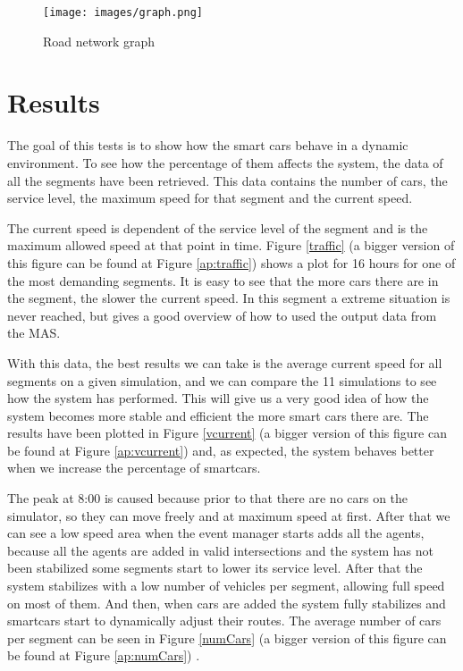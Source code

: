 \begin{figure}[!ht]
  \centering
  \texttt{[image: images/graph.png]} 
  \caption{Road network graph}
  \label{graph}
\end{figure}

\section{Results}

The goal of this tests is to show how the smart cars behave in a dynamic environment. To see how the percentage of them affects the system, the data of all the segments have been retrieved. This data contains the number of cars, the service level, the maximum speed for that segment and the current speed.

The current speed is dependent of the service level of the segment and is the maximum allowed speed at that point in time. Figure \ref{traffic} (a bigger version of this figure can be found at Figure \ref{ap:traffic}) shows a plot for 16 hours for one of the most demanding segments. It is easy to see that the more cars there are in the segment, the slower the current speed. In this segment a extreme situation is never reached, but gives a good overview of how to used the output data from the MAS.

With this data, the best results we can take is the average current speed for all segments on a given simulation, and we can compare the 11 simulations to see how the system has performed. This will give us a very good idea of how the system becomes more stable and efficient the more smart cars there are. The results have been plotted in Figure \ref{vcurrent} (a bigger version of this figure can be found at Figure \ref{ap:vcurrent})  and, as expected, the system behaves better when we increase the percentage of smartcars.

The peak at 8:00 is caused because prior to that there are no cars on the simulator, so they can move freely and at maximum speed at first. After that we can see a low speed area when the event manager starts adds all the agents, because all the agents are added in valid intersections and the system has not been stabilized some segments start to lower its service level. After that the system stabilizes with a low number of vehicles per segment, allowing full speed on most of them. And then, when cars are added the system fully stabilizes and smartcars start to dynamically adjust their routes. The average number of cars per segment can be seen in Figure \ref{numCars} (a bigger version of this figure can be found at Figure \ref{ap:numCars}) .


